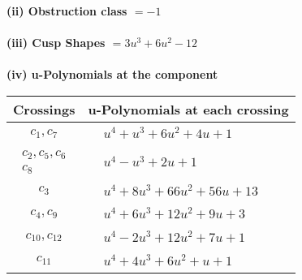 \documentclass[1p]{elsarticle_modified}
\theoremstyle{definition}
\begin{document}
\flushleft \textbf{(ii) Obstruction class $= -1$}\\~\\
\flushleft \textbf{(iii) Cusp Shapes $= 3 u^3+6 u^2-12$}\\~\\
\newpage\renewcommand{\arraystretch}{1}
\flushleft \textbf{(iv) u-Polynomials at the component}\newline \\
\begin{tabular}{m{50pt}|m{274pt}}
Crossings & \hspace{64pt}u-Polynomials at each crossing \\
\hline $$\begin{aligned}c_{1},c_{7}\end{aligned}$$&$\begin{aligned}
&u^4+u^3+6 u^2+4 u+1
\end{aligned}$\\
\hline $$\begin{aligned}c_{2},c_{5},c_{6}\\c_{8}\end{aligned}$$&$\begin{aligned}
&u^4- u^3+2 u+1
\end{aligned}$\\
\hline $$\begin{aligned}c_{3}\end{aligned}$$&$\begin{aligned}
&u^4+8 u^3+66 u^2+56 u+13
\end{aligned}$\\
\hline $$\begin{aligned}c_{4},c_{9}\end{aligned}$$&$\begin{aligned}
&u^4+6 u^3+12 u^2+9 u+3
\end{aligned}$\\
\hline $$\begin{aligned}c_{10},c_{12}\end{aligned}$$&$\begin{aligned}
&u^4-2 u^3+12 u^2+7 u+1
\end{aligned}$\\
\hline $$\begin{aligned}c_{11}\end{aligned}$$&$\begin{aligned}
&u^4+4 u^3+6 u^2+u+1
\end{aligned}$\\
\hline
\end{tabular}\\~\\
\end{document}
